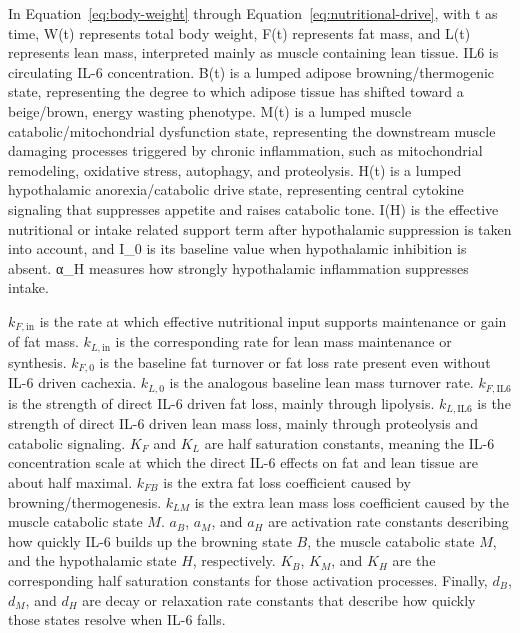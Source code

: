 \documentclass[11pt]{article}
\begin{document}
In Equation~\ref{eq:body-weight} through Equation~\ref{eq:nutritional-drive}, with t as time, W(t) represents total body weight, F(t) represents fat mass, and L(t) represents lean mass, interpreted mainly as muscle containing lean tissue. IL6 is circulating IL-6 concentration. B(t) is a lumped adipose browning/thermogenic state, representing the degree to which adipose tissue has shifted toward a beige/brown, energy wasting phenotype. M(t) is a lumped muscle catabolic/mitochondrial dysfunction state, representing the downstream muscle damaging processes triggered by chronic inflammation, such as mitochondrial remodeling, oxidative stress, autophagy, and proteolysis. H(t) is a lumped hypothalamic anorexia/catabolic drive state, representing central cytokine signaling that suppresses appetite and raises catabolic tone. I(H) is the effective nutritional or intake related support term after hypothalamic suppression is taken into account, and I\_0 is its baseline value when hypothalamic inhibition is absent. α\_H measures how strongly hypothalamic inflammation suppresses intake.
\par\medskip

$k_{F,\mathrm{in}}$ is the rate at which effective nutritional input supports maintenance or gain of fat mass. $k_{L,\mathrm{in}}$ is the corresponding rate for lean mass maintenance or synthesis. $k_{F,0}$ is the baseline fat turnover or fat loss rate present even without IL-6 driven cachexia. $k_{L,0}$ is the analogous baseline lean mass turnover rate. $k_{F,\mathrm{IL6}}$ is the strength of direct IL-6 driven fat loss, mainly through lipolysis. $k_{L,\mathrm{IL6}}$ is the strength of direct IL-6 driven lean mass loss, mainly through proteolysis and catabolic signaling. $K_{F}$ and $K_{L}$ are half saturation constants, meaning the IL-6 concentration scale at which the direct IL-6 effects on fat and lean tissue are about half maximal. $k_{FB}$ is the extra fat loss coefficient caused by browning/thermogenesis. $k_{LM}$ is the extra lean mass loss coefficient caused by the muscle catabolic state $M$. $a_{B}$, $a_{M}$, and $a_{H}$ are activation rate constants describing how quickly IL-6 builds up the browning state $B$, the muscle catabolic state $M$, and the hypothalamic state $H$, respectively. $K_{B}$, $K_{M}$, and $K_{H}$ are the corresponding half saturation constants for those activation processes. Finally, $d_{B}$, $d_{M}$, and $d_{H}$ are decay or relaxation rate constants that describe how quickly those states resolve when IL-6 falls.
\par\medskip
\end{document}

